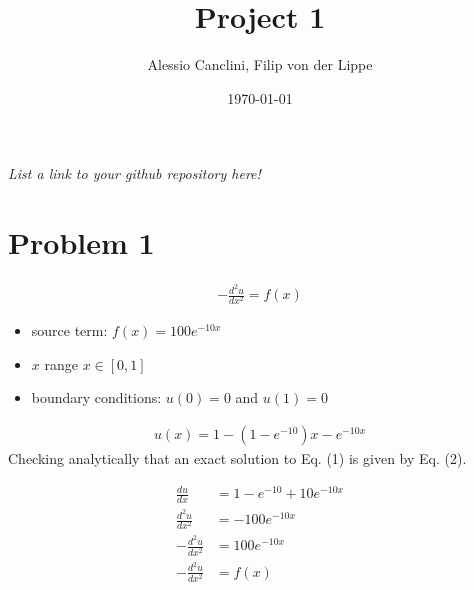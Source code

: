 \documentclass[english,notitlepage]{revtex4-1}  %
\begin{document}
\title{Project 1}      %
\author{Alessio Canclini, Filip von der Lippe}          %
\date{\today}                             %
\noaffiliation                            %


\maketitle

\textit{List a link to your github repository here!}

\section*{Problem 1}
\begin{align}
  - \frac{d^2u}{dx^2} = f(x)
\end{align}

\begin{itemize}
  \item source term: $f(x) = 100e^{-10x}$
  \item $x$ range $x \in [0,1]$
  \item boundary conditions: $u(0) = 0$ and $u(1) = 0$
\end{itemize}

\begin{align}
  u(x) = 1 - (1 - e^{-10})x- e^{-10x}
\end{align}
Checking analytically that an exact solution to Eq. (1) is given by Eq. (2).

\begin{align*}
  \frac{du}{dx} & = 1 - e^{-10} + 10e^{-10x} \\
  \frac{d^2u}{dx^2} & = -100e^{-10x} \\
  -\frac{d^2u}{dx^2} & = 100e^{-10x} \\
  -\frac{d^2u}{dx^2} & = f(x)
\end{align*}
\end{document}
